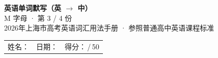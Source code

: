 \documentclass[10pt,a4paper]{article}
\begin{document}
\pagestyle{plain}

\begin{center}
{\LARGE\bfseries 英语单词默写（英 $\to$ 中）}\\[0.22em]
{\large M 字母 · 第 3 / 4 份}\\[0.18em]
{\small 2026年上海市高考英语词汇用法手册 · 参照普通高中英语课程标准}
\end{center}

\vspace{0.25em}
\noindent\begin{tabular}{@{}p{}@{}p{}@{}p{}@{}}
姓名：\underline{\hspace{2.0cm}} & 日期：\underline{\hspace{2.0cm}} & 得分：\underline{\hspace{1.3cm}}\,/\,50 \\
\end{tabular}

\vspace{0.3em}

\vspace{0.08em}
\end{document}
